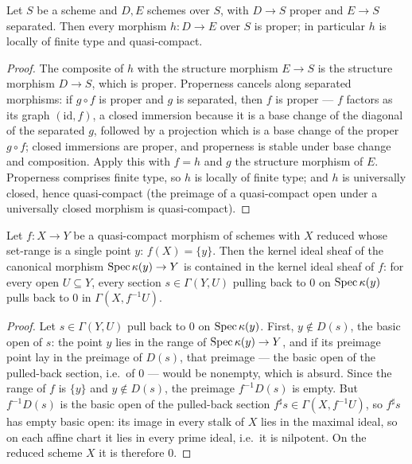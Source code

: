 \begin{theorem}
  \label{pa-thm:overHom_isProper}
  \leanok

  Let \(S\) be a scheme and \(D, E\) schemes over \(S\), with \(D \to S\) proper and
  \(E \to S\) separated. Then every morphism \(h : D \to E\) over \(S\) is proper; in
  particular \(h\) is locally of finite type and quasi-compact.
\end{theorem}
\begin{proof}
  \leanok
  The composite of \(h\) with the structure morphism \(E \to S\) is the structure
  morphism \(D \to S\), which is proper. Properness cancels along separated morphisms:
  if \(g \circ f\) is proper and \(g\) is separated, then \(f\) is proper --- \(f\)
  factors as its graph \((\mathrm{id}, f)\), a closed immersion because it is a base
  change of the diagonal of the separated \(g\), followed by a projection which is a
  base change of the proper \(g \circ f\); closed immersions are proper, and properness
  is stable under base change and composition. Apply this with \(f = h\) and \(g\) the
  structure morphism of \(E\). Properness comprises finite type, so \(h\) is locally of
  finite type; and \(h\) is universally closed, hence quasi-compact (the preimage of a
  quasi-compact open under a universally closed morphism is quasi-compact).
\end{proof}

\begin{lemma}
  \label{pa-lem:ker_fromSpecResidueField_le}
  \leanok

  Let \(f : X \to Y\) be a quasi-compact morphism of schemes with \(X\) reduced whose
  set-range is a single point \(y\): \(f(X) = \{y\}\). Then the kernel ideal sheaf of
  the canonical morphism \(\operatorname{Spec} \kappa(y) \to Y\) is contained in the kernel ideal
  sheaf of \(f\): for every open \(U \subseteq Y\), every section \(s \in \Gamma(Y, U)\)
  pulling back to \(0\) on \(\operatorname{Spec} \kappa(y)\) pulls back to \(0\) in
  \(\Gamma(X, f^{-1}U)\).
\end{lemma}
\begin{proof}
  \leanok
  Let \(s \in \Gamma(Y, U)\) pull back to \(0\) on \(\operatorname{Spec} \kappa(y)\). First,
  \(y \notin D(s)\), the basic open of \(s\): the point \(y\) lies in the range of
  \(\operatorname{Spec} \kappa(y) \to Y\), and if its preimage point lay in the preimage of \(D(s)\),
  that preimage --- the basic open of the pulled-back section, i.e.\ of \(0\) --- would
  be nonempty, which is absurd. Since the range of \(f\) is \(\{y\}\) and \(y \notin
  D(s)\), the preimage \(f^{-1}D(s)\) is empty. But \(f^{-1}D(s)\) is the basic open of
  the pulled-back section \(f^{\sharp}s \in \Gamma(X, f^{-1}U)\), so \(f^{\sharp}s\)
  has empty basic open: its image in every stalk of \(X\) lies in the maximal ideal, so
  on each affine chart it lies in every prime ideal, i.e.\ it is nilpotent. On the
  reduced scheme \(X\) it is therefore \(0\).
\end{proof}


